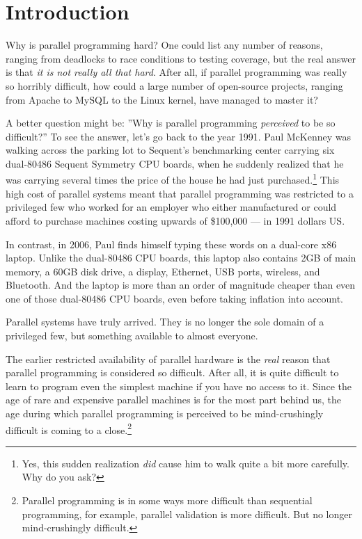 
\chapter{Introduction}
\label{chp:Introduction}


Why is parallel programming hard?
One could list any number of reasons, ranging from deadlocks to race conditions
to testing coverage, but the real answer is that {\em it is not really
all that hard}.
After all, if parallel programming was really so horribly difficult,
how could a large number of open-source projects, ranging from Apache
to MySQL to the Linux kernel, have managed to master it?

A better question might be: ''Why is parallel programming {\em perceived}
to be so difficult?''
To see the answer, let's go back to the year 1991.
Paul McKenney was walking across the parking lot to Sequent's benchmarking
center carrying six dual-80486 Sequent Symmetry CPU boards, when he suddenly
realized that he was carrying several times the price of the house he had
just purchased.\footnote{
	Yes, this sudden realization {\em did} cause him to walk quite
	a bit more carefully.
	Why do you ask?}
This high cost of parallel systems meant that
parallel programming was restricted to a privileged few who
worked for an employer who either manufactured or could afford to
purchase machines costing upwards of \$100,000 --- in 1991 dollars US.

In contrast, in 2006, Paul finds himself typing these words on a
dual-core x86 laptop.
Unlike the dual-80486 CPU boards, this laptop also contains 2GB of
main memory, a 60GB disk drive, a display, Ethernet, USB ports, wireless,
and Bluetooth.
And the laptop is more than an order of magnitude cheaper than
even one of those dual-80486 CPU boards, even before taking inflation
into account.

Parallel systems have truly arrived.
They is no longer the sole domain of a privileged few, but something
available to almost everyone.

The earlier restricted availability of parallel hardware
is the \emph{real} reason that parallel programming is considered so difficult.
After all, it is quite difficult to learn to program even the simplest
machine if you have no access to it.
Since the age of rare and expensive parallel machines is for the most
part behind us, the age during which
parallel programming is perceived to be mind-crushingly difficult is
coming to a close.\footnote{
	Parallel programming is in some ways more difficult than sequential
	programming, for example, parallel validation is more difficult.
	But no longer mind-crushingly difficult.}

